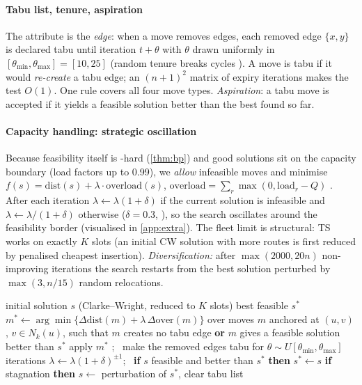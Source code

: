 \paragraph{Tabu list, tenure, aspiration} The attribute is the \emph{edge}: when a move removes edges,
each removed edge $\{x,y\}$ is declared tabu until iteration $t+\theta$ with $\theta$ drawn uniformly in
$[\theta_{\min},\theta_{\max}]=[10,25]$ (random tenure breaks cycles \citep{taillard1993parallel}). A move is tabu
if it would \emph{re-create} a tabu edge; an $(n{+}1)^2$ matrix of expiry iterations makes the test
$O(1)$. One rule covers all four move types. \emph{Aspiration}: a tabu move is accepted if it yields a
feasible solution better than the best found so far.

\paragraph{Capacity handling: strategic oscillation} Because feasibility itself is \NP-hard
(\cref{thm:bp}) and good solutions sit on the capacity boundary (load factors up to 0.99), we
\emph{allow} infeasible moves and minimise $f(s)=\mathrm{dist}(s)+\lambda\cdot\mathrm{overload}(s)$,
$\mathrm{overload}=\sum_r\max(0,\mathrm{load}_r-Q)$ \citep{gendreau1994tabu}. After each iteration
$\lambda\gets\lambda(1+\delta)$ if the current solution is infeasible and $\lambda\gets\lambda/(1+\delta)$
otherwise ($\delta=0.3$, \citep{cordeau2001unified}), so the search oscillates around the feasibility border
(visualised in \cref{app:extra}). The fleet limit is structural: TS works on exactly $K$ slots
(an initial CW solution with more routes is first reduced by penalised cheapest insertion).
\emph{Diversification:} after $\max(2000,20n)$ non-improving iterations the search restarts from the best solution
perturbed by $\max(3,n/15)$ random relocations.

\begin{algorithm}[t]
\caption{Granular tabu search with adaptive penalty}\label{alg:ts}
\small
\begin{algorithmic}[1]
\Require initial solution $s$ (Clarke--Wright, reduced to $K$ slots) \Ensure best feasible $s^\ast$
  \State $m^\ast\gets\arg\min\{\Delta\mathrm{dist}(m)+\lambda\,\Delta\mathrm{over}(m)\}$ over moves $m$ anchored at $(u,v)$, $v\in N_k(u)$, such that
  \Statex \hspace{1.1em}$m$ creates no tabu edge \textbf{or} $m$ gives a feasible solution better than $s^\ast$ 
  \State apply $m^\ast$ ; \ make the removed edges tabu for $\theta\sim U[\theta_{\min},\theta_{\max}]$ iterations
  \State $\lambda\gets\lambda(1+\delta)^{\pm1}$; \ \textbf{if} $s$ feasible and better than $s^\ast$ \textbf{then} $s^\ast\gets s$
  \State \textbf{if} stagnation \textbf{then} $s\gets$ perturbation of $s^\ast$, clear tabu list
\EndWhile
\end{algorithmic}
\end{algorithm}
